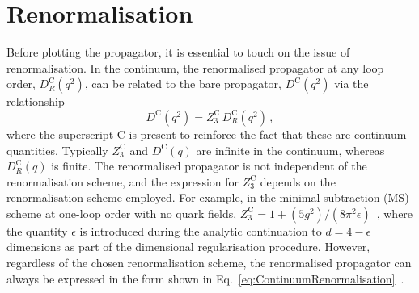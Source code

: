 \section{Renormalisation}\label{sec:Renormalisation}
Before plotting the propagator, it is essential to touch on the issue of renormalisation. In the continuum, the renormalised propagator at any loop order, $D_R^\text{C}(q^2)$, can be related to the bare propagator, $D^\text{C}(q^2)$ via the relationship
%
\begin{equation}
D^\text{C}(q^2) = Z^\text{C}_3 \, D_R^\text{C}(q^2)\, ,
\label{eq:ContinuumRenormalisation}
\end{equation}
%
where the superscript C is present to reinforce the fact that these are continuum quantities. Typically $Z^\text{C}_3$ and $D^\text{C}(q)$ are infinite in the continuum, whereas $D_R^\text{C}(q)$ is finite. The renormalised propagator is not independent of the renormalisation scheme, and the expression for $Z^\text{C}_3$ depends on the renormalisation scheme employed. For example, in the minimal subtraction (MS) scheme at one-loop order with no quark fields, $Z_3^\text{C}=1+(5g^2)/(8\pi^2\epsilon)$~\cite{ryder1996quantum}, where the quantity $\epsilon$ is introduced during the analytic continuation to $d = 4-\epsilon$ dimensions as part of the dimensional regularisation procedure. However, regardless of the chosen renormalisation scheme, the renormalised propagator can always be expressed in the form shown in Eq.~\eqref{eq:ContinuumRenormalisation}~\cite{vanRitbergen:1997va}.\\

